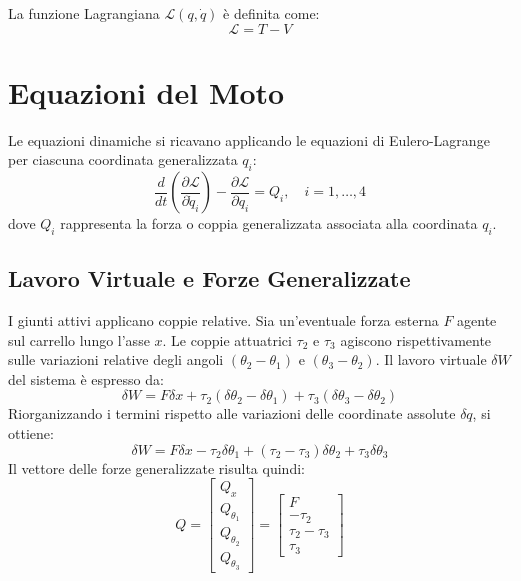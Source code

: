 \documentclass[11pt,a4paper]{article}
\begin{document}
	La funzione Lagrangiana $\mathcal{L}(q, \dot{q})$ è definita come:
	\begin{equation}
		\mathcal{L} = T - V
	\end{equation}
	
	\section{Equazioni del Moto}
	Le equazioni dinamiche si ricavano applicando le equazioni di Eulero-Lagrange per ciascuna coordinata generalizzata $q_i$:
	\begin{equation}
		\frac{d}{dt}\left(\frac{\partial \mathcal{L}}{\partial \dot{q}_i}\right) - \frac{\partial \mathcal{L}}{\partial q_i} = Q_i, \quad i=1,\dots,4
	\end{equation}
	dove $Q_i$ rappresenta la forza o coppia generalizzata associata alla coordinata $q_i$.
	
	\subsection{Lavoro Virtuale e Forze Generalizzate}
	I giunti attivi applicano coppie relative. Sia un'eventuale forza esterna $F$ agente sul carrello lungo l'asse $x$. Le coppie attuatrici $\tau_2$ e $\tau_3$ agiscono rispettivamente sulle variazioni relative degli angoli $(\theta_2 - \theta_1)$ e $(\theta_3 - \theta_2)$. Il lavoro virtuale $\delta W$ del sistema è espresso da:
	\begin{equation}
		\delta W = F\delta x + \tau_2(\delta\theta_2 - \delta\theta_1) + \tau_3(\delta\theta_3 - \delta\theta_2)
	\end{equation}
	Riorganizzando i termini rispetto alle variazioni delle coordinate assolute $\delta q$, si ottiene:
	\begin{equation}
		\delta W = F\delta x - \tau_2\delta\theta_1 + (\tau_2 - \tau_3)\delta\theta_2 + \tau_3\delta\theta_3
	\end{equation}
	Il vettore delle forze generalizzate risulta quindi:
	\begin{equation}
		Q = \begin{bmatrix} Q_x \\ Q_{\theta_1} \\ Q_{\theta_2} \\ Q_{\theta_3} \end{bmatrix} = \begin{bmatrix} F \\ -\tau_2 \\ \tau_2 - \tau_3 \\ \tau_3 \end{bmatrix}
	\end{equation}
	
\end{document}
